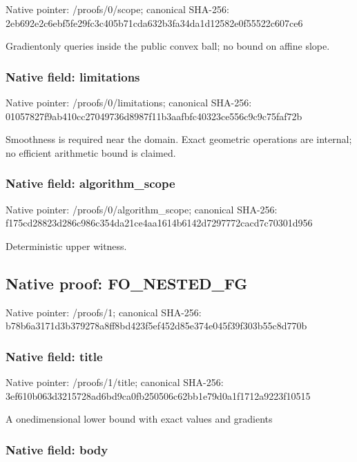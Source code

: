 \documentclass[10pt,a4paper]{article}
\begin{document}
Native pointer: /proofs/0/scope; canonical SHA-256: 2eb692e2c6ebf5fe29fc3c40\allowbreak{}5b71cda632b3fa34da1d1258\allowbreak{}2e0f55522c607ce6


Gradientonly queries inside the public convex ball; no bound on affine slope.


\subsubsection{Native field: limitations}


Native pointer: /proofs/0/limitations; canonical SHA-256: 01057827f9ab410cc2704973\allowbreak{}6d8987f11b3aafbfc40323ce\allowbreak{}556c9c9c75faf72b


Smoothness is required near the domain. Exact geometric operations are internal; no efficient arithmetic bound is claimed.


\subsubsection{Native field: algorithm\_scope}


Native pointer: /proofs/0/algorithm\_scope; canonical SHA-256: f175cd28823d286c986c354d\allowbreak{}a21ce4aa1614b6142d729777\allowbreak{}2cacd7c70301d956


Deterministic upper witness.


\subsection{Native proof: FO\_NESTED\_FG}


Native pointer: /proofs/1; canonical SHA-256: b78b6a3171d3b379278a8ff8\allowbreak{}bd423f5ef452d85e374e045f\allowbreak{}39f303b55c8d770b



\subsubsection{Native field: title}


Native pointer: /proofs/1/title; canonical SHA-256: 3ef610b063d3215728ad6bd9\allowbreak{}ca0fb250506c62bb1e79d0a1\allowbreak{}f1712a9223f10515


A onedimensional lower bound with exact values and gradients


\subsubsection{Native field: body}
\end{document}
